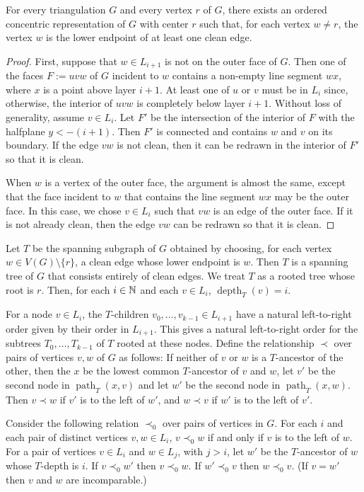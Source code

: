 \documentclass{patmorin}
\DeclareMathOperator{\depth}{depth}
\DeclareMathOperator{\pth}{path}
\begin{document}
\begin{lem}\label{clean_edge}
  For every triangulation $G$ and every vertex $r$ of $G$, there exists an ordered concentric representation of $G$ with center $r$ such that, for each vertex $w\neq r$, the vertex $w$ is the lower endpoint of at least one clean edge.
\end{lem}

\begin{proof}
  First, suppose that $w\in L_{i+1}$ is not on the outer face of $G$.  Then one of the faces $F:=uvw$ of $G$ incident to $w$ contains a non-empty line segment $wx$, where $x$ is a point above layer $i+1$. At least one of $u$ or $v$ must be in $L_{i}$ since, otherwise, the interior of $uvw$ is completely below layer $i+1$. Without loss of generality, assume $v\in L_i$. Let $F'$ be the intersection of the interior of $F$ with the halfplane $y<-(i+1)$. Then $F'$ is connected and contains $w$ and $v$ on its boundary.  If the edge $vw$ is not clean, then it can be redrawn in the interior of $F'$ so that it is clean.

  When $w$ is a vertex of the outer face, the argument is almost the same, except that the face incident to $w$ that contains the line segment $wx$ may be the outer face.  In this case, we chose $v\in L_i$ such that $vw$ is an edge of the outer face. If it is not already clean, then the edge $vw$ can be redrawn so that it is clean.
\end{proof}

Let $T$ be the spanning subgraph of $G$ obtained by choosing, for each vertex $w\in V(G)\setminus\{r\}$, a clean edge whose lower endpoint is $w$.  Then $T$ is a spanning tree of $G$ that consists entirely of clean edges.  We treat $T$ as a rooted tree whose root is $r$.  Then, for each $i\in\mathbb{N}$ and each $v\in L_i$, $\depth_T(v)=i$.

For a node $v\in L_i$, the $T$-children $v_0,\ldots,v_{k-1}\in L_{i+1}$ have a natural left-to-right order given by their order in $L_{i+1}$.  This gives a natural left-to-right order for the subtrees $T_0,\ldots,T_{k-1}$ of $T$ rooted at these nodes.  Define the relationship $\prec$ over pairs of vertices $v,w$ of $G$ as follows:  If neither of $v$ or $w$ is a $T$-ancestor of the other, then the $x$ be the lowest common $T$-ancestor of $v$ and $w$, let $v'$ be the second node in $\pth_T(x,v)$ and let $w'$ be the second node in $\pth_T(x,w)$.  Then $v\prec w$ if $v'$ is to the left of $w'$, and $w\prec v$ if $w'$ is to the left of $v'$.

Consider the following relation $\prec_0$ over pairs of vertices in $G$. For each $i$ and each pair of distinct vertices $v,w\in L_i$, $v\prec_0 w$ if and only if  $v$ is to the left of $w$.  For a pair of vertices $v\in L_i$ and $w\in L_j$, with $j>i$, let $w'$ be the $T$-ancestor of $w$ whose $T$-depth is $i$.  If $v\prec_0 w'$ then $v\prec_0 w$. If $w'\prec_0 v$ then $w\prec_0 v$. (If $v=w'$ then $v$ and $w$ are incomparable.)
\end{document}
